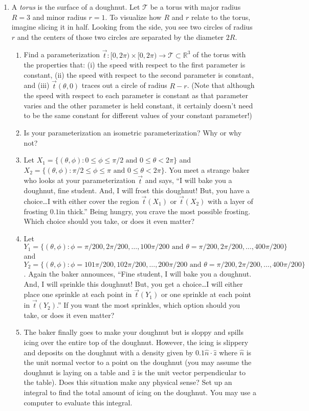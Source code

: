 \documentclass[letter]{article}
\newcommand{\R}{\mathbb{R}}
\begin{document}
\begin{enumerate}
		\item A \emph{torus} is the surface of a doughnut.  Let $\mathcal T$ be a torus with 
			major radius $R=3$ and minor radius $r=1$.  To visualize how $R$ and $r$
			relate to the torus, imagine slicing it in half.  Looking from the side,
			you see two circles of radius $r$ and the centers of those two circles
			are separated by the diameter $2R$.
		\begin{enumerate}
			\item Find a parameterization $\vec t:[0,2\pi)\times [0,2\pi)\to \mathcal T\subset \R^3$
				of the torus with the properties that: (i) the speed with respect to
				the first parameter is constant, (ii) the speed with respect to the second
				parameter is constant, and (iii) $\vec t(\theta, 0)$ traces out a circle
				of radius $R-r$.  (Note that although the speed with respect to
				each parameter is constant as that parameter varies and the other parameter
				is held constant, it certainly
				doesn't need to be the same constant for different values of your constant parameter!)
			\item Is your parameterization an isometric parameterization?  Why or why not?
			\item Let $X_1 =\{(\theta, \phi): 0\leq \phi\leq \pi/2\text{ and }0\leq \theta < 2\pi\}$
				and $X_2 =\{(\theta, \phi): \pi/2\leq \phi\leq \pi\text{ and }0\leq \theta < 2\pi\}$.
					You meet a strange baker who looks at your parameterization $\vec t$ and says,
				``I will bake you a doughnut, fine student.  And, I will frost this doughnut!
				But, you have a choice\ldots{}I with either cover the region $\vec t(X_1)$ or
				$\vec t(X_2)$ with a layer of frosting $0.1$in thick.''  Being hungry, you crave
				the most possible frosting.  Which choice should you take, or does it even matter?
			\item Let $Y_1 =\{(\theta, \phi): \phi=\pi/200,2\pi/200,\ldots, 100\pi/200\text{ and }\theta
				=\pi/200,2\pi/200,\ldots, 400\pi/200\}$ and 
				$Y_2 =\{(\theta, \phi): \phi=101\pi/200,102\pi/200,\ldots,200\pi/200\text{ and }\theta
				=\pi/200,2\pi/200,\ldots, 400\pi/200\}$.
				Again the baker announces, ``Fine student, I will bake you a doughnut.  And, I will
				sprinkle this doughnut! But, you get a choice\ldots{}I will either place
				one sprinkle at each point in $\vec t(Y_1)$ or one sprinkle at each point in 
				$\vec t(Y_2)$.''  If you want the most sprinkles, which option should you take, or
				does it even matter?
			\item The baker finally goes to make your doughnut but is sloppy and spills icing
				over the entire top of the doughnut.  However, the icing is slippery and
				deposits on the doughnut with a density given by $0.1\hat n\cdot \hat z$ where
				$\hat n$ is the unit normal vector to a point on the doughnut (you may assume the doughnut
				is laying on a table and $\hat z$ is the unit vector perpendicular to the
				table).  Does this situation make any physical sense?  Set up an integral to
				find the total amount of icing on the doughnut.  You may use a computer
				to evaluate this integral.
		\end{enumerate}


\end{enumerate}
\end{document}
